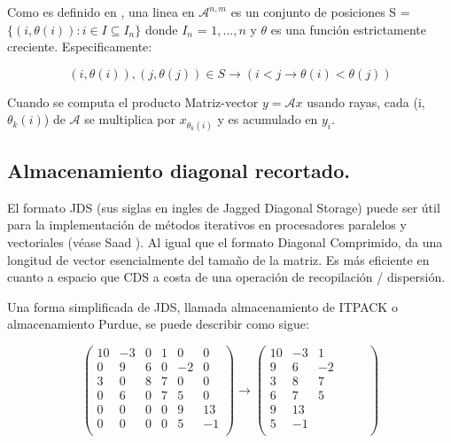 \documentclass[a4paper,openright,12pt, oneside]{book}
\newcommand{\implica}{\rightarrow}
\begin{document}
Como es definido en \cite{MELHEM}, una linea en $\mathcal{A}^{n,m}$ es un conjunto de posiciones 
S = $\{(i, \theta(i)): i \in I \subseteq I_{n} \}$ donde $I_{n}$ = ${1, ..., n}$ y $\theta$ es una funci\'on estrictamente creciente. Especificamente: 


$$(i, \theta(i)), (j, \theta(j)) \in S \implica (i < j \implica \theta(i) < \theta(j)) $$

Cuando se computa el producto Matriz-vector $ y = \mathcal{A}x $ usando rayas, cada (i, $\theta_{k}(i)$) de $\mathcal{A}$ se multiplica por $x_{\theta_{k}(i)}$ y es acumulado en $y_{i}$.


\subsection{Almacenamiento diagonal recortado.}

El formato JDS (sus siglas en ingles de Jagged Diagonal Storage) puede ser \'util para la implementaci\'on de m\'etodos iterativos en procesadores paralelos y vectoriales (v\'ease Saad \cite{JDS}). Al igual que el formato Diagonal Comprimido, da una longitud de vector esencialmente del tama\~no de la matriz. Es m\'as eficiente en cuanto a espacio que CDS a costa de una operaci\'on de recopilaci\'on / dispersi\'on.

Una forma simplificada de JDS, llamada almacenamiento de ITPACK o almacenamiento Purdue, se puede describir como sigue:

\begin{equation}
\left(
\begin{array}{cccccc}
 
10& -3& 0& 1& 0& 0\\
0&   9& 6& 0& -2& 0 \\
3&   0& 8& 7& 0& 0 \\
0&   6& 0& 7& 5& 0 \\
0&   0& 0& 0& 9& 13 \\
0&   0& 0& 0& 5& -1 \\
\end{array}
\right)
\implica
\left(
\begin{array}{cccccc}
 
10& -3& 1&  &  & \\
9& 6& -2& &  & \\
3& 8& 7& &  & \\
6& 7& 5& &  & \\
9& 13 & &  & \\
5& -1 & &  &\\
\end{array}
\right)
\end{equation}
\end{document}
